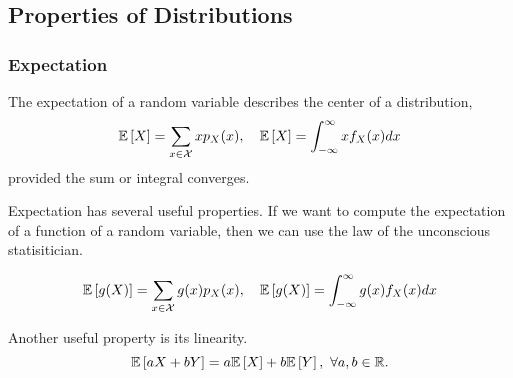 \subsection{Properties of Distributions}
\subsubsection{Expectation}
\begin{definition}
  The expectation of a random variable describes the center of a distribution,
  \[
	\mathbb{E}\left[X\right]=\sum_{x\in\mathcal{X}}xp_X(x), \quad \mathbb{E}\left[X\right] = \int_{-\infty}^{\infty}xf_X(x)dx
  \]
  provided the sum or integral converges.
  \label{defn:drv-expectation}
\end{definition}
Expectation has several useful properties.
If we want to compute the expectation of a function of a random variable, then we can use the law of the unconscious statisitician.
\begin{theorem}
  \[
	\mathbb{E}\left[g(X)\right] = \sum_{x\in\mathcal{X}}g(x)p_X(x), \quad \mathbb{E}\left[g(X)\right] = \int_{-\infty}^{\infty}g(x)f_X(x)dx
  \]
  \label{thm:unconscious-statistician}
\end{theorem}
Another useful property is its linearity.
\[
  \expect{aX+bY} = a\expect{X}+b\expect{Y},\ \forall a, b\in\mathbb{R}.
\]

